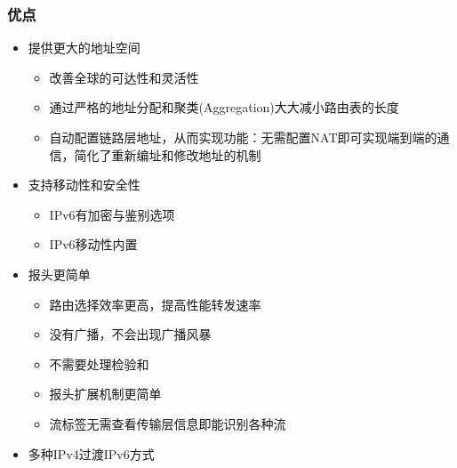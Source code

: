 \subsubsection{优点}
\begin{itemize}
	\item 提供更大的地址空间
\begin{itemize}
	\item 改善全球的可达性和灵活性
	\item 通过严格的地址分配和聚类(Aggregation)大大减小路由表的长度
	\item 自动配置链路层地址，从而实现功能：无需配置NAT即可实现端到端的通信，简化了重新编址和修改地址的机制
\end{itemize}
	\item 支持移动性和安全性
\begin{itemize}
	\item IPv6有加密与鉴别选项
	\item IPv6移动性内置
\end{itemize}
	\item 报头更简单
\begin{itemize}
	\item 路由选择效率更高，提高性能转发速率
	\item 没有广播，不会出现广播风暴
	\item 不需要处理检验和
	\item 报头扩展机制更简单
	\item 流标签无需查看传输层信息即能识别各种流
\end{itemize}
	\item 多种IPv4过渡IPv6方式
\end{itemize}